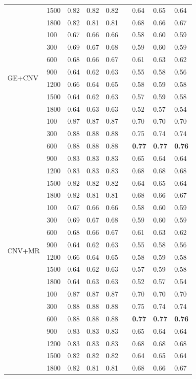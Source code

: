 \begin{table}
{\begin{tabular}{lllllllll}
		& 1500 & 0.82 & 0.82 & 0.82 && 0.64 & 0.65 & 0.64\\
		& 1800 & 0.82 & 0.81 & 0.81 && 0.68 & 0.66 & 0.67\\
		\hline
		\multirow{8}{*}{{GE+CNV}} & 100 & 0.67 & 0.66 & 0.66 && 0.58 & 0.60 & 0.59\\
		& 300 & 0.69 & 0.67 & 0.68 && 0.59 & 0.60 & 0.59\\
		& 600 & 0.68 & 0.66 & 0.67 && 0.61 & 0.63 & 0.62\\
		& 900 & 0.64 & 0.62 & 0.63 && 0.55 & 0.58 & 0.56\\
		& 1200 & 0.66 & 0.64 & 0.65 && 0.58 & 0.59 & 0.58\\
		& 1500 & 0.64 & 0.62 & 0.63 && 0.57 & 0.59 & 0.58\\
		& 1800 & 0.64 & 0.63 & 0.63 && 0.52 & 0.57 & 0.54\\
		\hline
		\multirow{8}{*}{{GE+MR}} & 100 & 0.87 & 0.87 & 0.87 && 0.70 & 0.70 & 0.70\\
		& 300 & 0.88 & 0.88 & 0.88  && 0.75 & 0.74 & 0.74 \\
    	& 600 & 0.88 & 0.88 & 0.88 && \textbf{0.77} & \textbf{0.77} & \textbf{0.76} \\
		& 900 & 0.83 & 0.83 & 0.83 && 0.65 & 0.64 & 0.64\\
		& 1200 & 0.83 & 0.83 & 0.83 && 0.68 & 0.68 & 0.68\\
		& 1500 & 0.82 & 0.82 & 0.82 && 0.64 & 0.65 & 0.64\\
		& 1800 & 0.82 & 0.81 & 0.81 && 0.68 & 0.66 & 0.67\\
		\hline
		\multirow{8}{*}{{CNV+MR}} & 100 & 0.67 & 0.66 & 0.66 && 0.58 & 0.60 & 0.59\\
		& 300 & 0.69 & 0.67 & 0.68 && 0.59 & 0.60 & 0.59\\
		& 600 & 0.68 & 0.66 & 0.67 && 0.61 & 0.63 & 0.62\\
		& 900 & 0.64 & 0.62 & 0.63 && 0.55 & 0.58 & 0.56\\
		& 1200 & 0.66 & 0.64 & 0.65 && 0.58 & 0.59 & 0.58\\
		& 1500 & 0.64 & 0.62 & 0.63 && 0.57 & 0.59 & 0.58\\
		& 1800 & 0.64 & 0.63 & 0.63 && 0.52 & 0.57 & 0.54\\
		\hline
		\multirow{8}{*}{{GE+MR+CNV}} & 100 & 0.87 & 0.87 & 0.87 && 0.70 & 0.70 & 0.70\\
		& 300 & 0.88 & 0.88 & 0.88  && 0.75 & 0.74 & 0.74 \\
    	& 600 & 0.88 & 0.88 & 0.88 && \textbf{0.77} & \textbf{0.77} & \textbf{0.76} \\
		& 900 & 0.83 & 0.83 & 0.83 && 0.65 & 0.64 & 0.64\\
		& 1200 & 0.83 & 0.83 & 0.83 && 0.68 & 0.68 & 0.68\\
		& 1500 & 0.82 & 0.82 & 0.82 && 0.64 & 0.65 & 0.64\\
		& 1800 & 0.82 & 0.81 & 0.81 && 0.68 & 0.66 & 0.67\\
		\hline
	\end{tabular}}
	\label{Table:OOD_result_1}
\end{table}
\fi 


